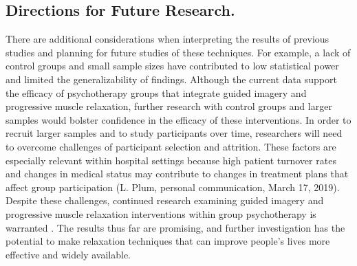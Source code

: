 \subsection*{Directions for Future Research.}

There are additional considerations when interpreting the results of previous studies and planning for future studies of these techniques. For example, a lack of control groups and small sample sizes have contributed to low statistical power and limited the generalizability of findings. Although the current data support the efficacy of psychotherapy groups that integrate guided imagery and progressive muscle relaxation, further research with control groups and larger samples would bolster confidence in the efficacy of these interventions. In order to recruit larger samples and to study participants over time, researchers will need to overcome challenges of participant selection and attrition. These factors are especially relevant within hospital settings because high patient turnover rates and changes in medical status may contribute to changes in treatment plans that affect group participation (L. Plum, personal communication, March 17, 2019). Despite these challenges, continued research examining guided imagery and progressive muscle relaxation interventions within group psychotherapy is warranted \citep{scherwitz2005therapy}. The results thus far are promising, and further investigation has the potential to make relaxation techniques that can improve people’s lives more effective and widely available.
